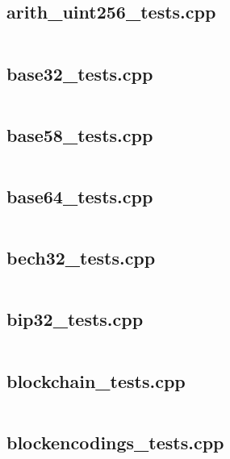 \documentclass{article}
\begin{document}
\subsection{arith\_uint256\_tests.cpp}
\inputminted{cpp}{/home/dufferzafar/dev/@clones/bitcoin/src/test/arith_uint256_tests.cpp}
\newpage

\subsection{base32\_tests.cpp}
\inputminted{cpp}{/home/dufferzafar/dev/@clones/bitcoin/src/test/base32_tests.cpp}
\newpage

\subsection{base58\_tests.cpp}
\inputminted{cpp}{/home/dufferzafar/dev/@clones/bitcoin/src/test/base58_tests.cpp}
\newpage

\subsection{base64\_tests.cpp}
\inputminted{cpp}{/home/dufferzafar/dev/@clones/bitcoin/src/test/base64_tests.cpp}
\newpage

\subsection{bech32\_tests.cpp}
\inputminted{cpp}{/home/dufferzafar/dev/@clones/bitcoin/src/test/bech32_tests.cpp}
\newpage

\subsection{bip32\_tests.cpp}
\inputminted{cpp}{/home/dufferzafar/dev/@clones/bitcoin/src/test/bip32_tests.cpp}
\newpage

\subsection{blockchain\_tests.cpp}
\inputminted{cpp}{/home/dufferzafar/dev/@clones/bitcoin/src/test/blockchain_tests.cpp}
\newpage

\subsection{blockencodings\_tests.cpp}
\inputminted{cpp}{/home/dufferzafar/dev/@clones/bitcoin/src/test/blockencodings_tests.cpp}
\newpage
\end{document}
